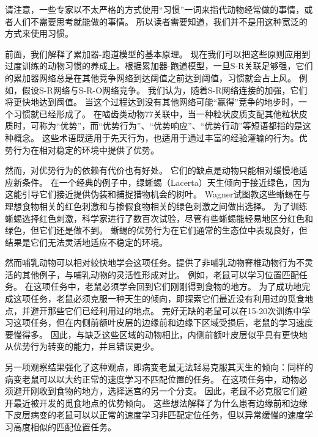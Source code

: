 请注意，一些专家以不太严格的方式使用“习惯”一词来指代动物经常做的事情，或者人们不需要思考就能做的事情。
所以读者需要知道，我们并不是用这种宽泛的方式来使用习惯。\par


前面，我们解释了累加器-跑道模型的基本原理。
现在我们可以把这些原则应用到过度训练的动物习惯的养成上。根据累加器-跑道模型，一旦S-R关联足够强，它们的累加器网络总是在其他竞争网络到达阈值之前达到阈值，习惯就会占上风。
例如，假设S-R网络与S-R-O网络竞争。
我们认为，随着S-R网络连接的加强，它们将更快地达到阈值。
当这个过程达到没有其他网络可能“赢得”竞争的地步时，一个习惯就已经形成了。
在啮齿类动物77关联中，当一种粒状皮质支配其他粒状皮质时，可称为“优势”，而“优势行为”、“优势响应”、“优势行动”等短语都指的是这种概念。
这些术语既适用于先天行为，也适用于通过丰富的经验灌输的行为。优势行为在相对稳定的环境中提供了优势。\par


然而，对优势行为的依赖有代价也有好处。
它们的缺点是动物只能相对缓慢地适应新条件。
在一个经典的例子中，绿蜥蜴（Lacerta）天生倾向于接近绿色，因为这能引导它们接近提供伪装和捕捉猎物机会的树叶。
Wagner\cite{wagner1932farbensinn}试图教这些蜥蜴在与理想食物相关的红色刺激和与掺假食物相关的绿色刺激之间做出选择。
为了训练蜥蜴选择红色刺激，科学家进行了数百次试验，尽管有些蜥蜴能轻易地区分红色和绿色，但它们还是做不到。
蜥蜴的优势行为在它们通常的生态位中表现良好，但结果是它们无法灵活地适应不稳定的环境。\par


然而哺乳动物可以相对较快地学会这项任务。\cite{murray2011can}提供了非哺乳动物脊椎动物行为不灵活的其他例子，与哺乳动物的灵活性形成对比。
例如，老鼠可以学习位置匹配任务。
在这项任务中，老鼠必须学会回到它们刚刚得到食物的地方\cite{marighetto1998effects}。
为了成功地完成这项任务，老鼠必须克服一种天生的倾向，即探索它们最近没有利用过的觅食地点，并避开那些它们已经利用过的地点。
完好无缺的老鼠可以在15-20次训练中学习这项任务，但在内侧前额叶皮层的边缘前和边缘下区域受损后，老鼠的学习速度要慢得多\cite{dias2000effects}。
因此，与缺乏这些区域的动物相比，内侧前额叶皮层似乎具有更快地从优势行为转变的能力，并且错误更少。\par


另一项观察结果强化了这种观点，即病变老鼠无法轻易克服其天生的倾向：同样的病变老鼠可以以大约正常的速度学习不匹配位置的任务\cite{dias2000effects}。
在这项任务中，动物必须避开刚收到食物的地方，选择迷宫的另一个分支。
因此，老鼠不必克服它们避开最近被开发的觅食地点的优势倾向。
这些想法解释了为什么患有边缘前和边缘下皮层病变的老鼠可以以正常的速度学习非匹配定位任务，但以异常缓慢的速度学习高度相似的匹配位置任务。\par


